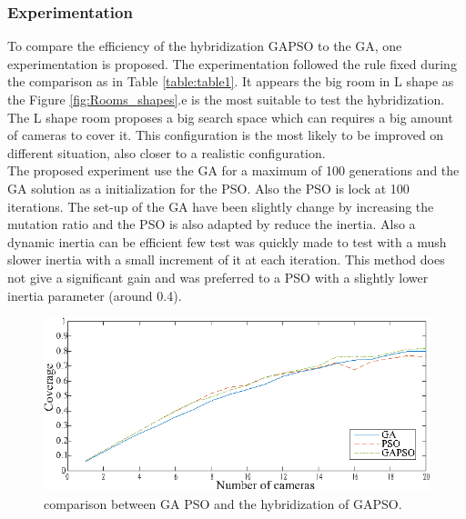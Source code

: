 \subsubsection{Experimentation}
To compare the efficiency of the hybridization GAPSO to the GA, one experimentation is proposed.
The experimentation followed the rule fixed during the comparison as in Table \ref{table:table1}. %
It appears the big room in L shape as the Figure \ref{fig:Rooms_shapes}.e is the most suitable to test the hybridization.  %
The L shape room proposes a big search space which can requires a big amount of cameras to cover it. This configuration is the most likely to be improved on different situation, also closer to a realistic configuration.\\
The proposed experiment use the GA for a maximum of 100 generations and the GA solution as a initialization for the PSO. Also the PSO is lock at 100 iterations. %
The set-up of the GA have been slightly change by increasing the mutation ratio and the PSO is also adapted by reduce the inertia. Also a dynamic inertia can be efficient few test was quickly made to test with a mush slower inertia with a small increment  of it at each iteration. This method does not give a significant gain and was preferred to a PSO with a slightly lower inertia parameter (around 0.4).
\begin{figure}[t]
  \includegraphics[width=\linewidth]{img/GAPSO_GA_PSO3.eps}
  \caption{comparison between GA PSO and the hybridization of GAPSO.
}\label{fig:GAPSO}
  \endminipage\hfill
\end{figure}

